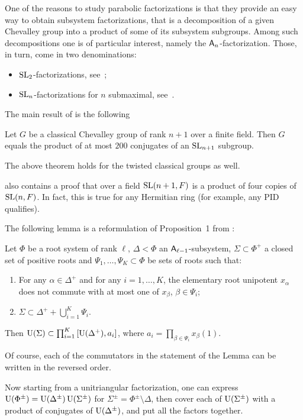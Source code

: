 One of the reasons to study parabolic factorizations is that they provide an easy way to obtain subsystem factorizations, that is a decomposition of a given Chevalley group into a product of some of its subsystem subgroups. Among such decompositions one is of particular interest, namely the $\mathsf{A}_n$-factorization. Those, in turn, come in two denominations:
\begin{itemize}
\item $\operatorname{SL}_2$-factorizations, see~\cite{LiebNikShaSL2,VavKovSL2};
\item $\operatorname{SL}_n$-factorizations for $n$ submaximal, see~\cite{NikProdDecomp}.
\end{itemize}
The main result of \cite{NikProdDecomp} is the following
\begin{thm*}
Let $G$ be a classical Chevalley group of rank $n+1$ over a finite field. Then $G$ equals the product of at most $200$ conjugates of an $\operatorname{SL}_{n+1}$ subgroup.
\end{thm*}
The above theorem holds for the twisted classical groups as well.

\cite{NikProdDecomp} also contains a proof that over a field $\operatorname{SL}(n+1,F)$ is a product of four copies of $\operatorname{SL}(n,F)$. In fact, this is true for any Hermitian ring (for example, any PID qualifies).

The following lemma is a reformulation of Proposition~1 from \cite{NikProdDecomp}:
\begin{lemma}
Let $\Phi$ be a root system of rank $\ell$, $\Delta<\Phi$ an $\mathsf{A}_{\ell-1}$-subsystem, $\Sigma\subset\Phi^+$ a closed set of positive roots and $\Psi_1,\ldots,\Psi_K\subset\Phi$ be sets of roots such that:
\begin{enumerate}
\item For any $\alpha\in\Delta^+$ and for any $i=1,\ldots,K$, the elementary root unipotent $x_\alpha$ does not commute with at most one of $x_\beta$, $\beta\in\Psi_i$;
\item $\Sigma\subset\Delta^++\bigcup_{i=1}^K\Psi_i$.
\end{enumerate} 
Then $\operatorname{U}(\Sigma)\subset\prod_{i=1}^{K}\left[\operatorname{U}(\Delta^+),a_i\right]$, where $a_i=\prod_{\beta\in\Psi_i}x_\beta(1)$.
\end{lemma}
Of course, each of the commutators in the statement of the Lemma can be written in the reversed order.

Now starting from a unitriangular factorization, one can express $\operatorname{U}(\Phi^\pm)=\operatorname{U}(\Delta^\pm)\operatorname{U}(\Sigma^\pm)$ for $\Sigma^\pm=\Phi^\pm\setminus\Delta$, then cover each of $\operatorname{U}(\Sigma^\pm)$ with a product of conjugates of $\operatorname{U}(\Delta^\pm)$, and put all the factors together.

